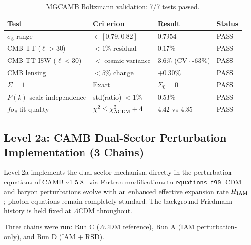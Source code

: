 \documentclass[twocolumn,a4paper,aps,prd,twocolumn,showpacs,notitlepage,superscriptaddress,nofootinbib]{article}
\newcommand{\LCDM}{$\Lambda$CDM}
\begin{document}
\begin{table}[t]
  \centering
  \caption{MGCAMB Boltzmann validation: 7/7 tests passed.}
  \label{tab:boltzmann}
  \begin{tabular}{llll}
    \toprule
    Test & Criterion & Result & Status \\
    \midrule
    $\sigma_8$ range & $\in [0.79, 0.82]$ & $0.7954$ & PASS \\
    CMB TT ($\ell > 30$) & $< 1\%$ residual & $0.17\%$ & PASS \\
    CMB TT ISW ($\ell < 30$) & $<$ cosmic variance & $3.6\%$ (CV $\sim 63\%$)
      & PASS \\
    CMB lensing & $< 5\%$ change & $+0.30\%$ & PASS \\
    $\Sigma = 1$ & Exact & $\Sigma_0 = 0$ & PASS \\
    $P(k)$ scale-independence & std(ratio) $< 1\%$ & $0.53\%$ & PASS \\
    $f\sigma_8$ fit quality & $\chi^2 \leq \chi^2_{\rm \Lambda CDM} + 4$ &
      $4.42$ vs $4.85$ & PASS \\
    \bottomrule
  \end{tabular}
\end{table}

\subsection{Level 2a: CAMB Dual-Sector Perturbation Implementation (3 Chains)}
\label{sec:level2a}

Level 2a implements the dual-sector mechanism directly in the perturbation
equations of CAMB v1.5.8~\citep{CAMB} via Fortran modifications to
\texttt{equations.f90}.  CDM and baryon perturbations evolve with an enhanced
effective expansion rate $H_{\rm IAM}$; photon equations remain completely
standard.  The background Friedmann history is held fixed at \LCDM{}
throughout.

Three chains were run: Run C (\LCDM{} reference), Run A (IAM perturbation-only),
and Run D (IAM + RSD).
\end{document}
